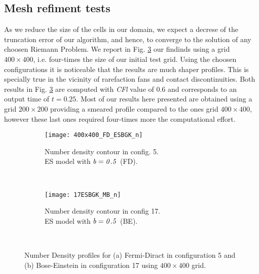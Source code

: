 \documentclass{rsproca}%
\begin{document}
\subsection{Mesh refiment tests}
As we reduce the size of the cells in our domain, we expect a decrese of the truncation error of our algorithm, and hence, to converge to the solution of any choosen Riemann Problem. We report in Fig. \ref{fig:Mesh_refinement} our findinds using a grid $400\times400$, i.e. four-times the size of our initial test grid. Using the choosen configurations it is noticeable that the results are much shaper profiles. This is specially true in the vicinity of rarefaction fans and contact discontinuities. Both results in Fig. \ref{fig:Mesh_refinement} are computed with \emph{CFl} value of 0.6 and corresponds to an output time of $t=0.25$. Most of our results here presented are obtained using a grid $200\times200$ providing a smeared profile compared to the ones grid $400\times400$, however these last ones required four-times more the computational effort.

\begin{figure}
        \centering
        \begin{subfigure}[b]{0.49\textwidth}
                \centering
                \texttt{[image: 400x400\_FD\_ESBGK\_n]}
                \caption{Number density contour in config. 5. \\ ES model with $\it{b=0.5}$ (FD).}
                \label{fig:400x400_FD_ESBGK_n}
        \end{subfigure}%
				~ %
				\begin{subfigure}[b]{0.49\textwidth}
                \centering
                \texttt{[image: 17ESBGK\_MB\_n]} %
                \caption{Number density contour in config 17. \\ ES model with $\it{b=0.5}$ (BE).}
                \label{fig:400x400_BE_ESBGK_p}
        \end{subfigure}%
				~ %
				\caption{Number Density profiles for (a) Fermi-Diract in configuration 5 and (b) Bose-Einstein in configuration 17 using $400\times400$ grid.}
				\label{fig:Mesh_refinement}
\end{figure}
\end{document}
